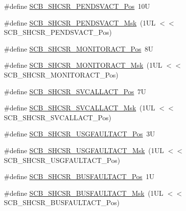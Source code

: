 \begin{DoxyCompactItemize}
\item 
\#define \mbox{\hyperlink{group___c_m_s_i_s___s_c_b_ga9b9fa69ce4c5ce7fe0861dbccfb15939}{S\+C\+B\+\_\+\+S\+H\+C\+S\+R\+\_\+\+P\+E\+N\+D\+S\+V\+A\+C\+T\+\_\+\+Pos}}~10U
\item 
\#define \mbox{\hyperlink{group___c_m_s_i_s___s_c_b_gae0e837241a515d4cbadaaae1faa8e039}{S\+C\+B\+\_\+\+S\+H\+C\+S\+R\+\_\+\+P\+E\+N\+D\+S\+V\+A\+C\+T\+\_\+\+Msk}}~(1\+U\+L $<$$<$ S\+C\+B\+\_\+\+S\+H\+C\+S\+R\+\_\+\+P\+E\+N\+D\+S\+V\+A\+C\+T\+\_\+\+Pos)
\item 
\#define \mbox{\hyperlink{group___c_m_s_i_s___s_c_b_ga8b71cf4c61803752a41c96deb00d26af}{S\+C\+B\+\_\+\+S\+H\+C\+S\+R\+\_\+\+M\+O\+N\+I\+T\+O\+R\+A\+C\+T\+\_\+\+Pos}}~8U
\item 
\#define \mbox{\hyperlink{group___c_m_s_i_s___s_c_b_gaad09b4bc36e9bccccc2e110d20b16e1a}{S\+C\+B\+\_\+\+S\+H\+C\+S\+R\+\_\+\+M\+O\+N\+I\+T\+O\+R\+A\+C\+T\+\_\+\+Msk}}~(1\+U\+L $<$$<$ S\+C\+B\+\_\+\+S\+H\+C\+S\+R\+\_\+\+M\+O\+N\+I\+T\+O\+R\+A\+C\+T\+\_\+\+Pos)
\item 
\#define \mbox{\hyperlink{group___c_m_s_i_s___s_c_b_ga977f5176be2bc8b123873861b38bc02f}{S\+C\+B\+\_\+\+S\+H\+C\+S\+R\+\_\+\+S\+V\+C\+A\+L\+L\+A\+C\+T\+\_\+\+Pos}}~7U
\item 
\#define \mbox{\hyperlink{group___c_m_s_i_s___s_c_b_ga634c0f69a233475289023ae5cb158fdf}{S\+C\+B\+\_\+\+S\+H\+C\+S\+R\+\_\+\+S\+V\+C\+A\+L\+L\+A\+C\+T\+\_\+\+Msk}}~(1\+U\+L $<$$<$ S\+C\+B\+\_\+\+S\+H\+C\+S\+R\+\_\+\+S\+V\+C\+A\+L\+L\+A\+C\+T\+\_\+\+Pos)
\item 
\#define \mbox{\hyperlink{group___c_m_s_i_s___s_c_b_gae06f54f5081f01ed3f6824e451ad3656}{S\+C\+B\+\_\+\+S\+H\+C\+S\+R\+\_\+\+U\+S\+G\+F\+A\+U\+L\+T\+A\+C\+T\+\_\+\+Pos}}~3U
\item 
\#define \mbox{\hyperlink{group___c_m_s_i_s___s_c_b_gab3166103b5a5f7931d0df90949c47dfe}{S\+C\+B\+\_\+\+S\+H\+C\+S\+R\+\_\+\+U\+S\+G\+F\+A\+U\+L\+T\+A\+C\+T\+\_\+\+Msk}}~(1\+U\+L $<$$<$ S\+C\+B\+\_\+\+S\+H\+C\+S\+R\+\_\+\+U\+S\+G\+F\+A\+U\+L\+T\+A\+C\+T\+\_\+\+Pos)
\item 
\#define \mbox{\hyperlink{group___c_m_s_i_s___s_c_b_gaf272760f2df9ecdd8a5fbbd65c0b767a}{S\+C\+B\+\_\+\+S\+H\+C\+S\+R\+\_\+\+B\+U\+S\+F\+A\+U\+L\+T\+A\+C\+T\+\_\+\+Pos}}~1U
\item 
\#define \mbox{\hyperlink{group___c_m_s_i_s___s_c_b_ga9d7a8b1054b655ad08d85c3c535d4f73}{S\+C\+B\+\_\+\+S\+H\+C\+S\+R\+\_\+\+B\+U\+S\+F\+A\+U\+L\+T\+A\+C\+T\+\_\+\+Msk}}~(1\+U\+L $<$$<$ S\+C\+B\+\_\+\+S\+H\+C\+S\+R\+\_\+\+B\+U\+S\+F\+A\+U\+L\+T\+A\+C\+T\+\_\+\+Pos)
$$
\end{DoxyCompactItemize}
